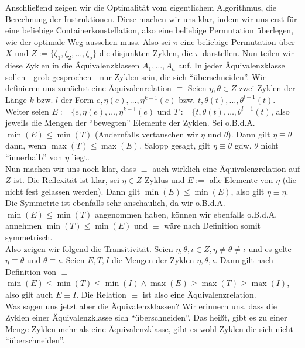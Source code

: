Anschließend zeigen wir die Optimalität vom eigentlichem Algorithmus, die Berechnung der Instruktionen.
Diese machen wir uns klar, indem wir uns erst für eine beliebige Containerkonstellation, also eine beliebige Permutation überlegen, wie der optimale Weg aussehen muss.
Also sei $\pi$ eine beliebige Permutation über $X$ und $Z := \{\zeta_1, \zeta_2, \dots, \zeta_o\}$ die disjunkten Zyklen, die $\pi$ darstellen.
Nun teilen wir diese Zyklen in die Äquivalenzklassen $A_1, \dots, A_a$ auf.
In jeder Äquivalenzklasse sollen - grob gesprochen - nur Zyklen sein, die sich ``überschneiden''.
Wir definieren uns zunächst eine Äquivalenrelation $\equiv$
Seien $\eta,\theta \in Z$ zwei Zyklen der Länge $k$ bzw. $l$ der Form $e, \eta(e), \dots, \eta^{k-1}(e)$ bzw. $t, \theta(t), \dots, \theta^{l-1}(t)$.
Weiter seien $E := \{e, \eta(e), \dots, \eta^{k-1}(e)$ und $T := \{t, \theta(t), \dots, \theta^{l-1}(t)$, also jeweils die Mengen der ``bewegten'' Elemente der Zyklen.
Sei o.B.d.A. $\min(E) \leq \min(T)$ (Andernfalls vertauschen wir $\eta$ und $\theta$). Dann gilt $\eta \equiv \theta$ dann, wenn $\max(T) \leq \max(E)$.
Salopp gesagt, gilt $\eta \equiv \theta$ gdw. $\theta$ nicht ``innerhalb'' von $\eta$ liegt. \\
Nun machen wir uns noch klar, dass $\equiv$ auch wirklich eine Äquivalenzrelation auf $Z$ ist.
Die Reflexität ist klar, sei $\eta \in Z$ Zyklus und $E := $ alle Elemente von $\eta$ (die nicht fest gelassen werden).
Dann gilt $\min(E) \leq \min(E)$, also gilt $\eta \equiv \eta$.\\
Die Symmetrie ist ebenfalls sehr anschaulich, da wir o.B.d.A. $\min(E) \leq \min(T)$ angenommen haben,
können wir ebenfalls o.B.d.A. annehmen $\min(T) \leq \min(E)$ und $\equiv$ wäre nach Definition somit symmetrisch.\\
Also zeigen wir folgend die Transitivität.
Seien $\eta, \theta, \iota \in Z, \eta \neq \theta \neq \iota$ und es gelte $\eta \equiv \theta$ und $\theta \equiv \iota$.
Seien $E,T,I$ die Mengen der Zyklen $\eta, \theta, \iota$.
Dann gilt nach Definition von $\equiv$ $\min(E) \leq \min(T) \leq \min(I) \wedge \max(E) \geq \max(T) \geq \max(I)$, also gilt auch $E \equiv I$.
Die Relation $\equiv$ ist also eine Äquivalenzrelation.\\
Was sagen uns jetzt aber die Äquivalenzklassen? Wir erinnern uns, dass die Zyklen einer Äquivalenzklasse sich ``überschneiden''.
Das heißt, gibt es zu einer Menge Zyklen mehr als eine Äquivalenzklasse, gibt es wohl Zyklen die sich nicht ``überschneiden''.\\
